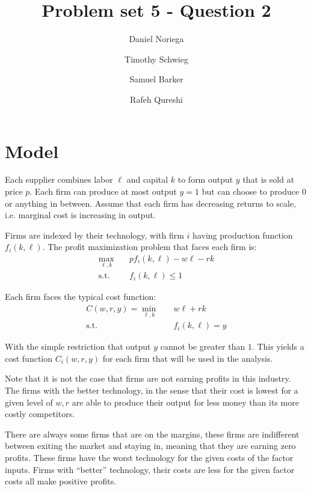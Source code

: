 \documentclass[12pt]{paper}
\begin{document}
\author{Daniel Noriega \and Timothy Schwieg \and Samuel Barker \and
  Rafeh Qureshi }
\title{Problem set 5 - Question 2}

\maketitle

\section*{Model}

Each supplier combines labor $\ell$ and capital $k$ to form output $y$
that is sold at price $p$. Each firm can produce at most output $y =
1$ but can choose to produce $0$ or anything in between. Assume that
each firm has decreasing returns to scale, i.e. marginal cost is
increasing in output.

Firms are indexed by their technology, with firm $i$ having production
function $f_i (k, \ell)$. The profit maximization problem that faces each
firm is:
\begin{align*}
  \max_{\ell,k} \quad& p f_i (k, \ell ) - w \ell - r k\\
  \text{s.t.} \quad & f_i ( k, \ell ) \leq 1
\end{align*}

Each firm faces the typical cost function:
\begin{align*}
  C( w, r, y ) = \min_{\ell,k} \quad & w \ell + r k\\
  \text{s.t.} \quad & f_i ( k, \ell ) = y
\end{align*}

With the simple restriction that output $y$ cannot be greater than
$1$. This yields a cost function $C_i ( w, r, y)$ for each firm that
will be used in the analysis.

Note that it is not the case that firms are not earning profits in
this industry. The firms with the better technology, in the sense that
their cost is lowest for a given level of $w,r$ are able to produce
their output for less money than its more costly competitors.

There are always some firms that are on the margins, these firms are
indifferent between exiting the market and staying in, meaning that
they are earning zero profits. These firms have the worst technology
for the given costs of the factor inputs. Firms with ``better''
technology, their costs are less for the given factor costs all make
positive profits.
\end{document}
